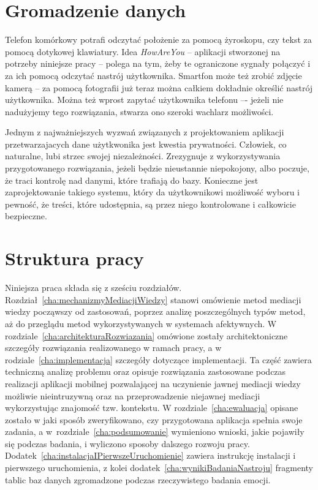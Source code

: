 
\section{Gromadzenie danych}
\label{sec:gromadzenieDanych}

Telefon komórkowy potrafi odczytać położenie za pomocą żyroskopu, czy tekst za pomocą dotykowej klawiatury. Idea \textit{HowAreYou} -- aplikacji stworzonej na potrzeby niniejsze pracy -- polega na tym, żeby te ograniczone sygnały połączyć i za ich pomocą odczytać nastrój użytkownika. Smartfon może też zrobić zdjęcie kamerą -- za pomocą fotografii już teraz można całkiem dokładnie określić nastrój użytkownika. Można też wprost zapytać użytkownika telefonu –- jeżeli nie nadużyjemy tego rozwiązania, stwarza ono szeroki wachlarz możliwości.

Jednym z najważniejszych wyzwań związanych z projektowaniem aplikacji przetwarzajacych dane użytkwonika jest kwestia prywatności. Człowiek, co naturalne, lubi strzec swojej niezależności. Zrezygnuje z wykorzystywania przygotowanego rozwiązania, jeżeli będzie nieustannie niepokojony, albo poczuje, że traci kontrolę nad danymi, które trafiają do bazy. Konieczne jest zaprojektowanie takiego systemu, który da użytkownikowi możliwość wyboru i pewność, że treści, które udostępnia, są przez niego kontrolowane i całkowicie bezpieczne.



\section{Struktura pracy}
\label{sec:strukturaPracy}

Niniejsza praca składa się z sześciu rozdziałów. Rozdział~\ref{cha:mechanizmyMediacjiWiedzy} stanowi omówienie metod mediacji wiedzy począwszy od zastosowań, poprzez analizę poszczególnych typów metod, aż do przeglądu metod wykorzystywanych w systemach afektywnych. W rozdziale~\ref{cha:architekturaRozwiazania} omówione zostały architektoniczne szczegóły rozwiązania realizowanego w ramach pracy, a w rodziale~\ref{cha:implementacja} szczegóły dotyczące implementacji. Ta część zawiera techniczną analizę problemu oraz opisuje rozwiązania zastosowane podczas realizacji aplikacji mobilnej pozwalającej na uczynienie jawnej mediacji wiedzy możliwie nieintruzywną oraz na przeprowadzenie niejawnej mediacji wykorzystując znajomość tzw. kontekstu. W rozdziale~\ref{cha:ewaluacja} opisane zostało w jaki sposób zweryfikowano, czy przygotowana aplikacja spełnia swoje zadania, a w~rozdziale~\ref{cha:podsumowanie} wymieniono wnioski, jakie pojawiły się podczas badania, i wyliczono sposoby dalszego rozwoju pracy. Dodatek~\ref{cha:instalacjaIPierwszeUruchomienie} zawiera instrukcję instalacji i pierwszego uruchomienia, z kolei dodatek~\ref{cha:wynikiBadaniaNastroju} fragmenty tablic baz danych zgromadzone podczas rzeczywistego badania emocji.
